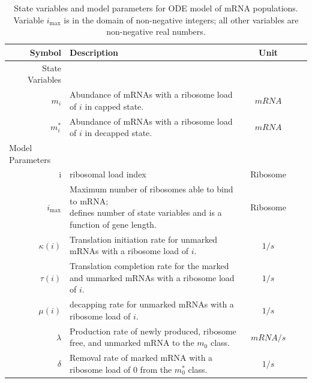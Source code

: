 \documentclass[review]{elsarticle}
\newcommand{\imax}{\ensuremath{{i_{\max}}}\xspace}
\begin{document}
\begin{table}
\centering
\begin{tabular}{|rp{4in}|c|c|c|}\hline
\textbf{Symbol}&\textbf{Description}&\textbf{Unit} \\\hline
State Variables & &  \\ \hline
$m_i$ & Abundance of mRNAs with a ribosome load of $i$ in capped state. & $mRNA$ \\
$m_i^*$ & Abundance of mRNAs with a ribosome load of $i$ in decapped state. & $mRNA$ \\ \hline
\multicolumn{1}{l}{Model Parameters} \\ \hline
i & ribosomal load index & Ribosome\\
  \imax & \shortstack{Maximum number of ribosomes able to bind to mRNA;\\
           defines number of state variables and is a function of gene length.} & Ribosome \\
$\kappa(i)$ & Translation initiation rate for unmarked mRNAs with a ribosome load of $i$. & $1/s$\\
$\tau(i)$ & Translation completion rate for the marked and unmarked mRNAs with a ribosome load of $i$. & $1/s$\\
$\mu(i)$ & decapping rate for unmarked mRNAs with a ribosome load of $i$. & $1/s$\\
$\lambda$ & Production rate of newly produced, ribosome free, and unmarked mRNA to the $m_0$ class. & $mRNA/s$\\
$\delta$ & Removal rate of marked mRNA with a ribosome load of 0 from the $m_0^*$ class. & $1/s$\\ \hline 
\end{tabular}
\caption{State variables and model parameters for ODE model of mRNA populations.
Variable \imax is in the domain of non-negative integers; all other variables are non-negative real numbers.}
\label{tab:params}
\end{table}
\end{document}
